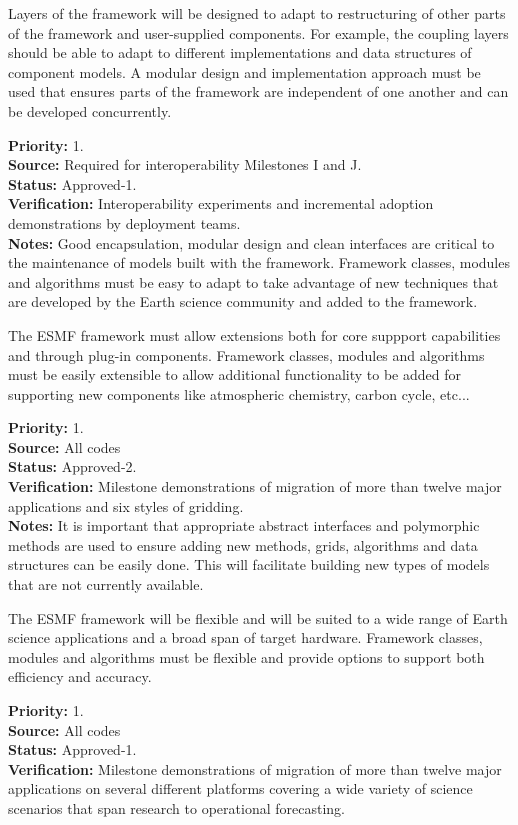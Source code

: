 Layers of the framework will be designed to adapt to restructuring of
other parts of the framework and user-supplied components.  For
example, the coupling layers should be able to adapt to different
implementations and data structures of component models.
A modular design and implementation approach must be used that ensures
parts of the framework are independent of one another and can be 
developed concurrently.
\begin{reqlist}
{\bf Priority:} 1. \\
{\bf Source:} Required for interoperability Milestones I and J. \\
{\bf Status:} Approved-1. \\
{\bf Verification:} Interoperability experiments and incremental
adoption demonstrations by deployment teams.\\
{\bf Notes:} Good encapsulation, modular design and clean interfaces are critical to the
maintenance of models built with the framework. Framework classes, modules and algorithms must be
easy to adapt to take advantage of new techniques that are developed
by the Earth science community and added to the framework.
\end{reqlist}

 The ESMF framework must allow extensions both
for core suppport capabilities and through plug-in components.
Framework classes, modules and algorithms must be easily extensible
to allow additional functionality to be added for supporting new components
like atmospheric chemistry, carbon cycle, etc...
\begin{reqlist}
{\bf Priority:} 1. \\
{\bf Source:} All codes\\
{\bf Status:} Approved-2. \\
{\bf Verification:} Milestone demonstrations of migration
of more than twelve major applications and six styles of gridding.\\
{\bf Notes:} It is important that appropriate abstract interfaces and polymorphic 
methods are used to ensure adding new methods, grids, algorithms and data structures
can be easily done. This will facilitate building new types of models that are not
currently available.
\end{reqlist}

 The ESMF framework will be flexible and will
be suited to a wide range of Earth science applications and a broad span
of target hardware. Framework classes, modules and algorithms must be flexible and
provide options to support both efficiency and accuracy.
\begin{reqlist}
{\bf Priority:} 1. \\
{\bf Source:} All codes\\
{\bf Status:} Approved-1. \\
{\bf Verification:} Milestone demonstrations of migration
of more than twelve major applications on several different
platforms covering a wide variety of science scenarios
that span research to operational forecasting.
\end{reqlist}

